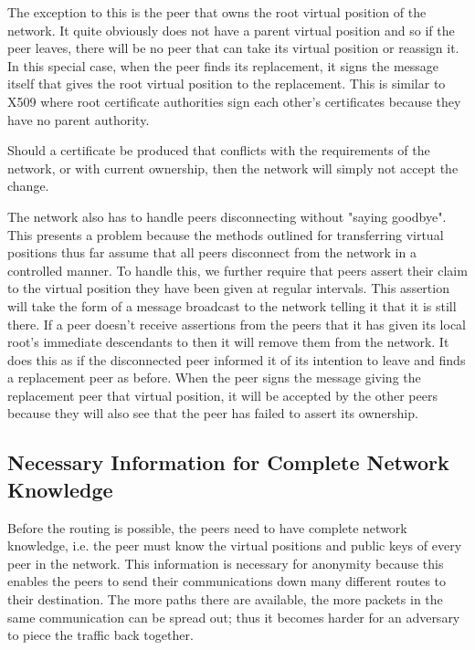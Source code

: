 \documentclass[ %
                    author={Luke Murray},
                supervisor={Dr. Simon Hollis},
                     title={Shadow Peer-to-Peer Networks},
                  subtitle={},
                    degree={MEng},
                      year={2013} ]{thesis}
\begin{document}
The exception to this is the peer that owns the root virtual position of the network. It quite obviously does not have a parent virtual position and so if the peer leaves, there will be no peer that can take its virtual position or reassign it. In this special case, when the peer finds its replacement, it signs the message itself that gives the root virtual position to the replacement. This is similar to X509 where root certificate authorities sign each other's certificates because they have no parent authority.

Should a certificate be produced that conflicts with the requirements of the network, or with current ownership, then the network will simply not accept the change.

The network also has to handle peers disconnecting without "saying goodbye". This presents a problem because the methods outlined for transferring virtual positions thus far assume that all peers disconnect from the network in a controlled manner. To handle this, we further require that peers assert their claim to the virtual position they have been given at regular intervals. This assertion will take the form of a message broadcast to the network telling it that it is still there. If a peer doesn't receive assertions from the peers that it has given its local root's immediate descendants to then it will remove them from the network. It does this as if the disconnected peer informed it of its intention to leave and finds a replacement peer as before. When the peer signs the message giving the replacement peer that virtual position, it will be accepted by the other peers because they will also see that the peer has failed to assert its ownership.

\subsection{Necessary Information for Complete Network Knowledge}

Before the routing is possible, the peers need to have complete network knowledge, i.e. the peer must know the virtual positions and public keys of every peer in the network. This information is necessary for anonymity because this enables the peers to send their communications down many different routes to their destination. The more paths there are available, the more packets in the same communication can be spread out; thus it becomes harder for an adversary to piece the traffic back together.
\end{document}
